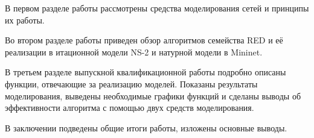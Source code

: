 В первом разделе работы рассмотрены средства моделирования сетей и принципы их работы.

Во втором разделе работы приведен обзор алгоритмов семейства RED и её реализации в итационной модели NS-2 и натурной модели в Mininet.

В третьем разделе выпускной квалификационной работы подробно описаны функции, отвечающие за
реализацию моделей. Показаны результаты моделирования, выведены необходимые графики функций и сделаны выводы об эффективности алгоритма с помощью двух средств моделирования.

В заключении подведены общие итоги работы, изложены основные выводы.


